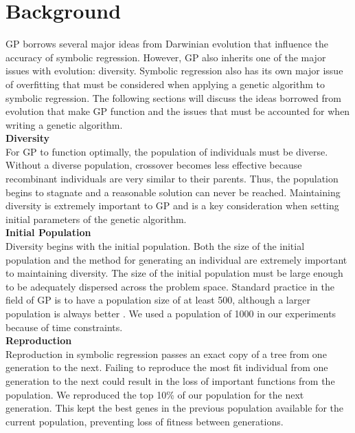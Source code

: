 \section{Background}
\label{sec:background}

GP borrows several major ideas from Darwinian evolution that influence the accuracy of symbolic regression. However, GP also inherits one of the major issues with evolution: diversity. Symbolic regression also has its own major issue of overfitting that must be considered when applying a genetic algorithm to symbolic regression. The following sections will discuss the ideas borrowed from evolution that make GP function and the issues that must be accounted for when writing a genetic algorithm.\\

\textbf{Diversity}\\
For GP to function optimally, the population of individuals must be diverse. Without a diverse population, crossover becomes less effective because recombinant individuals are very similar to their parents. Thus, the population begins to stagnate and a reasonable solution can never be reached. Maintaining diversity is extremely important to GP and is a key consideration when setting initial parameters of the genetic algorithm.\\

\textbf{Initial Population}\\
	Diversity begins with the initial population. Both the size of the initial population and the method for generating an individual are extremely important to maintaining diversity. The size of the initial population must be large enough to be adequately dispersed across the problem space. Standard practice in the field of GP is to have a population size of at least 500, although a larger population is always better \cite{poli08:fieldguide}. We used a population of 1000 in our experiments because of time constraints.\\

\textbf{Reproduction}\\
	Reproduction in symbolic regression passes an exact copy of a tree from one generation to the next. Failing to reproduce the most fit individual from one generation to the next could result in the loss of important functions from the population. We reproduced the top 10\% of our population for the next generation. This kept the best genes in the previous population available for the current population, preventing loss of fitness between generations.\\

